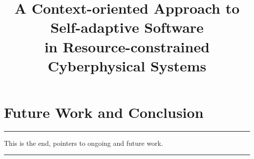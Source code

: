 \documentclass[10pt, conference, compsocconf]{IEEEtran}
\begin{document}
\title{A Context-oriented Approach to Self-adaptive Software\\ in Resource-constrained Cyberphysical Systems}


\author{}


\maketitle










\section{Future Work and Conclusion}
\label{sec:ending}

\hrule
This is the end, pointers to ongoing and future work.
\hrule


\IEEEpeerreviewmaketitle



\end{document}
